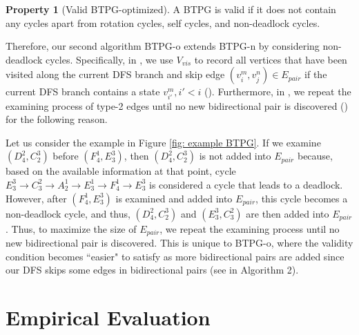 \documentclass[letterpaper]{article}
\theoremstyle{definition}
\newtheorem{property}{Property}
\begin{document}
\begin{property}[Valid BTPG-optimized]\label{pro:BTPG-o}
A BTPG is valid if it does not contain any cycles apart from rotation cycles, self cycles, and non-deadlock cycles.
\end{property}

Therefore, our second algorithm BTPG-o extends BTPG-n by considering non-deadlock cycles. Specifically, in , we use $V_{vis}$ to record all vertices that have been visited along the current DFS branch and skip edge $(v_i^m, v_j^n) \in E_{pair}$ if the current DFS branch contains a state $v_{i'}^m, i'<i$ (). Furthermore, in , we repeat the examining process of type-2 edges until no new bidirectional pair is discovered () for the following reason.











Let us consider the example in Figure \ref{fig: example BTPG}.
If we examine $(D^2_4,C^3_2)$ before $(F^1_4,E^3_3)$, then $(D^2_4,C^3_2)$ is not added into $E_{pair}$ because, based on the available information at that point, cycle $E^3_3 \rightarrow C^2_3 \rightarrow A^1_2  \rightarrow E^1_3 \rightarrow F^1_4 \rightarrow E^3_3$ is considered a cycle that leads to a deadlock. However, after $(F^1_4, E^3_3)$ is examined and added into $E_{pair}$, this cycle becomes a non-deadlock cycle, and thus, $(D^2_4,C^3_2)$ and $(E^3_3,C^2_3)$ are then added into $E_{pair}$.
Thus, to maximize the size of $E_{pair}$, we repeat the examining process until no new bidirectional pair is discovered. This is unique to BTPG-o, where the validity condition becomes ``easier" to satisfy as more bidirectional pairs are added since our DFS skips some edges in bidirectional pairs (see  in Algorithm 2). %

\section{Empirical Evaluation}
\end{document}
